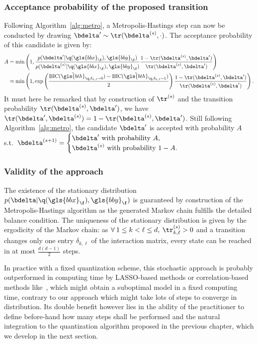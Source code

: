 \subsubsection{Acceptance probability of the proposed transition}


Following Algorithm~\eqref{alg:metro}, a Metropolis-Hastings step can now be conducted by drawing $\bdelta' \sim \tr(\bdelta^{(s)},\cdot)$. The acceptance probability of this candidate is given by:
\begin{align*}
A & = \min \left( 1, \frac{p(\bdelta' | \q(\gls{bbx}_\f), \gls{bby}_\f)}{p(\bdelta^{(s)} | \q(\gls{bbx}_\f), \gls{bby}_\f)} \frac{1-\tr(\bdelta^{(s)},\bdelta')}{\tr(\bdelta^{(s)},\bdelta')} \right) \\
& \approx \min \left( 1, \exp \left( \frac{\text{BIC}(\hat{\gls{bth}}_{\q,\delta_{k,\ell}=0}) - \text{BIC}(\hat{\gls{bth}}_{\q,\delta_{k,\ell}=1})}{2} \right) \frac{1-\tr(\bdelta^{(s)},\bdelta')}{\tr(\bdelta^{(s)},\bdelta')} \right).
\end{align*}
It must here be remarked that by construction of $\tr^{(s)}$ and the transition probability $\tr(\bdelta^{(s)},\bdelta')$, we have $\tr(\bdelta',\bdelta^{(s)}) = 1 - \tr(\bdelta^{(s)},\bdelta')$. Still following Algorithm~\eqref{alg:metro}, the candidate $\bdelta'$ is accepted with probability $A$ s.t.\ $\bdelta^{(s+1)} = \begin{cases} \bdelta' \text{ with probability } A, \\ \bdelta^{(s)} \text{ with probability } 1-A. \end{cases}$

\subsubsection{Validity of the approach}


The existence of the stationary distribution $p(\bdelta | \q(\gls{bbx}_\f),\gls{bby}_\f)$ is guaranteed by construction of the Metropolis-Hastings algorithm as the generated Markov chain fulfills the detailed balance condition. The uniqueness of the stationary distribution is given by the ergodicity of the Markov chain: as $\forall \: 1 \leq  k < \ell \leq d, \: \tr_{k,\ell}^{(s)} > 0$ and a transition changes only one entry $\delta_{k,\ell}$ of the interaction matrix, every state can be reached in at most $\frac{d(d-1)}{2}$ steps.

In practice with a fixed quantization scheme, this stochastic approach is probably outperformed in computing time by LASSO-based methods or correlation-based methods like~\cite{simon}, which might obtain a suboptimal model in a fixed computing time, contrary to our approach which might take lots of steps to converge in distribution. Its double benefit however lies in the ability of the practitioner to define before-hand how many steps shall be performed and the natural integration to the quantization algorithm proposed in the previous chapter, which we develop in the next section.

